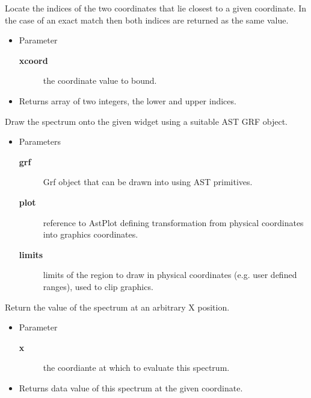 \begin{desc}Locate the indices of the two coordinates that lie closest to a
 given coordinate. In the case of an exact match then both
 indices are returned as the same value.
\begin{itemize}
\item{Parameter
  \begin{description}
   \item[\textbf{xcoord}]{the coordinate value to bound.}
  \end{description}}
\end{itemize}
\begin{itemize}
\item{Returns array of two integers, the lower and upper indices. }
\end{itemize}
\end{desc}

\begin{desc}Draw the spectrum onto the given widget using a suitable AST
 GRF object.
\begin{itemize}
\item{Parameters
  \begin{description}
   \item[\textbf{grf}]{Grf object that can be drawn into using AST
            primitives.}
   \item[\textbf{plot}]{reference to AstPlot defining transformation from
             physical coordinates into graphics coordinates.}
   \item[\textbf{limits}]{limits of the region to draw in physical
               coordinates (e.g. user defined ranges), used to
               clip graphics.}
  \end{description}}
\end{itemize}
\end{desc}

\begin{desc}Return the value of the spectrum at an arbitrary X position.
\begin{itemize}
\item{Parameter
  \begin{description}
   \item[\textbf{x}]{the coordiante at which to evaluate this spectrum.}
  \end{description}}
\end{itemize}
\begin{itemize}
\item{Returns data value of this spectrum at the given coordinate. }
\end{itemize}
\end{desc}

